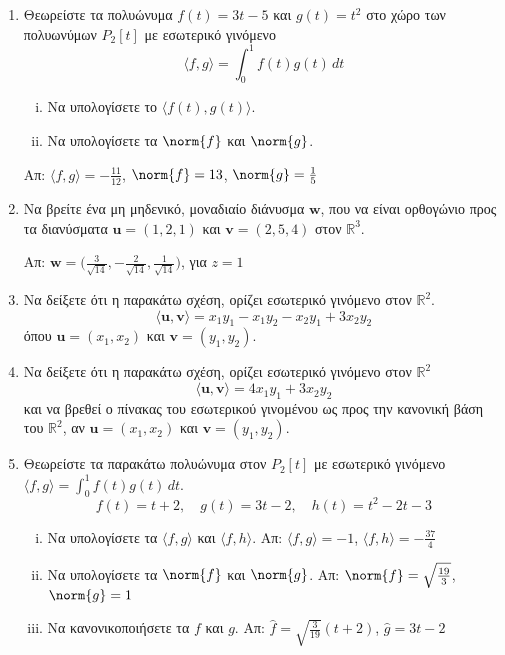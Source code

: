 \documentclass[a4paper,table]{report}
\begin{document}
\begin{center}
\end{center}

\vspace{\baselineskip}

\begin{enumerate}
  \item Θεωρείστε τα πολυώνυμα $ f(t) = 3t-5 $ και $ g(t) = t^{2} $ στο χώρο των 
    πολυωνύμων $ P_{2}[t] $ με εσωτερικό γινόμενο 
    \[
      \langle f, g \rangle = \int _{0}^{1}f(t)g(t) \,{dt}
    \] 
    \begin{enumerate}[i)]
      \item Να υπολογίσετε το $ \langle f(t), g(t)\rangle $.
      \item Να υπολογίσετε τα $ \norm{f} $ και $ \norm{g} $.
    \end{enumerate}
    \hfill Απ: $ \langle f, g\rangle = - \frac{11}{12} $, $ \norm{f} = 13 $, $
    \norm{g} = \frac{1}{5} $ 

  \item Να βρείτε ένα μη μηδενικό, μοναδιαίο διάνυσμα $ \mathbf{w} $, που να είναι 
    ορθογώνιο προς τα διανύσματα $ \mathbf{u} = (1,2,1) $ και $ \mathbf{v}=(2,5,4) $ 
    στον $ \mathbb{R}^{3} $.

    \hfill Απ: $ \mathbf{w} = \bigl(\frac{3}{\sqrt{14}} , - \frac{2}{\sqrt{14}} ,
    \frac{1}{\sqrt{14}}\bigr) $, για $ z=1 $

  \item Να δείξετε ότι η παρακάτω σχέση, ορίζει εσωτερικό γινόμενο στον 
    $ \mathbb{R}^{2} $.
    \[
      \langle \mathbf{u}, \mathbf{v}\rangle = x_{1} y_{1} - x_{1} y_{2} - x_{2} y_{1} + 
      3 x_{2} y_{2}
    \] 
    όπου $ \mathbf{u}=(x_{1}, x_{2}) $ και $ \mathbf{v}=(y_{1}, y_{2}) $.

  \item Να δείξετε ότι η παρακάτω σχέση, ορίζει εσωτερικό γινόμενο στον 
    $ \mathbb{R}^{2} $
    \[
      \langle \mathbf{u}, \mathbf{v}\rangle = 4 x_{1} y_{1} + 3 x_{2} y_{2} 
    \] 
    και να βρεθεί ο πίνακας του εσωτερικού γινομένου ως προς την κανονική βάση του $
    \mathbb{R}^{2} $, αν $ \mathbf{u}=(x_{1}, x_{2}) $ και $ \mathbf{v}=(y_{1}, y_{2}) $.


  \item Θεωρείστε τα παρακάτω πολυώνυμα στον $ P_{2}[t] $ με εσωτερικό γινόμενο 
    $ \langle f, g\rangle = \int _{0}^{1}f(t)g(t) \,{dt} $.
    \[
      f(t)=t+2, \quad g(t)=3t-2, \quad h(t)=t^{2}-2t-3 
    \]
    \begin{enumerate}[i)]
      \item Να υπολογίσετε τα $ \langle f, g\rangle $ και $ \langle f, h\rangle $. 
        \hfill Απ: $ \langle f, g\rangle = -1 $, $ \langle f, h\rangle = -
        \frac{37}{4} $ 
      \item Να υπολογίσετε τα $ \norm{f} $ και $ \norm{g} $. 
        \hfill Απ: $ \norm{f} = \sqrt{\frac{19}{3}} $, $ \norm{g} = 1 $  
      \item Να κανονικοποιήσετε τα $ f $ και $ g $. 
        \hfill Απ: $ \hat{f} = \sqrt{\frac{3}{19}} (t+2) $, $ \hat{g}= 3t-2 $  
    \end{enumerate}


\end{enumerate}
\end{document}

